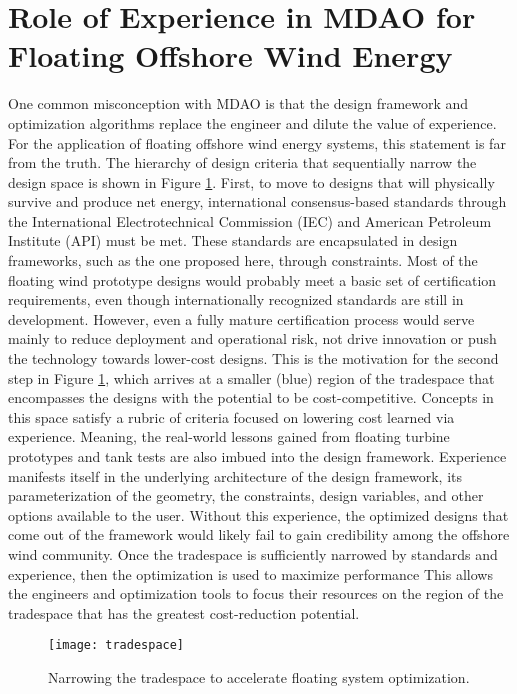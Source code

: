\section{Role of Experience in MDAO for Floating Offshore Wind Energy}
One common misconception with MDAO is that the design framework and
optimization algorithms replace the engineer and dilute the value of
experience.  For the application of floating offshore wind energy
systems, this statement is far from the truth.  The hierarchy of design
criteria that sequentially narrow the design space is shown in Figure
\ref{fig:tradespace}.  First, to move to designs that will physically
survive and produce net energy, international consensus-based standards
through the International Electrotechnical Commission (IEC) and American
Petroleum Institute (API) must be met.  These standards are encapsulated
in design frameworks, such as the one proposed here, through
constraints.  Most of the floating wind prototype designs would probably
meet a basic set of certification requirements, even though
internationally recognized standards are still in development.  However,
even a fully mature certification process would serve mainly to reduce
deployment and operational risk, not drive innovation or push the
technology towards lower-cost designs.  This is the motivation for the
second step in Figure \ref{fig:tradespace}, which arrives at a smaller
(blue) region of the tradespace that encompasses the designs with the
potential to be cost-competitive.  Concepts in this space satisfy a
rubric of criteria focused on lowering cost learned via experience.
Meaning, the real-world lessons gained from floating turbine prototypes
and tank tests are also imbued into the design framework.  Experience
manifests itself in the underlying architecture of the design framework,
its parameterization of the geometry, the constraints, design variables,
and other options available to the user.  Without this experience, the
optimized designs that come out of the framework would likely fail to
gain credibility among the offshore wind community.  Once the tradespace
is sufficiently narrowed by standards and experience, then the
optimization is used to maximize performance This allows the engineers
and optimization tools to focus their resources on the region of the
tradespace that has the greatest cost-reduction potential.

\begin{figure}[htbp]
  \begin{center}
    \texttt{[image: tradespace]}\\
    \caption{Narrowing the tradespace to accelerate floating system optimization.}
    \label{fig:tradespace}
  \end{center}
\end{figure}


